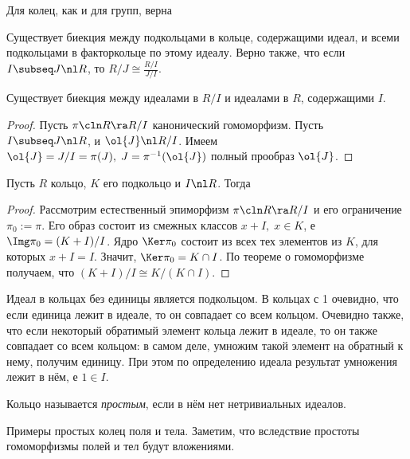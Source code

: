 \documentclass[a4paper]{article}
\begin{document}
Для колец, как и для групп, верна
\begin{theorem}[О соответствии]
Существует биекция между подкольцами в кольце, содержащими идеал, и всеми подкольцами в факторкольце  по
этому идеалу. Верно также, что если $I \subseq J \nl R$, то $R/J \cong \frac{R/I}{J/I}$.
\end{theorem}

\begin{stm}
Существует биекция между идеалами в $R/I$ и идеалами в $R$, содержащими $I$.
\end{stm}
\begin{proof}
Пусть $\pi\cln R \ra R/I$ канонический гомоморфизм. Пусть $I \subseq J \nl R$, и $\ol{J} \nl R/I$. Имеем
$\ol{J} = J/I = \pi(J), \; J=\pi^{-1}(\ol{J})$ полный прообраз $\ol{J}$.
\end{proof}

\begin{theorem}[Об изоморфизме]
Пусть $R$ кольцо, $K$ его подкольцо и $I \nl R$. Тогда
\end{theorem}
\begin{proof}
Рассмотрим естественный эпиморфизм $\pi\cln R \ra R/I$ и его ограничение $\pi_0:=\pi$\raisebox{-2pt}{$\rvert_K$}. Его образ
состоит из смежных классов $x+I, \; x \in K$, е $\Img \pi_0 = (K+I)/I$. Ядро $\Ker \pi_0$ состоит из всех
тех элементов из $K$, для которых $x+I=I$. Значит, $\Ker \pi_0 = K \cap I$. По теореме о гомоморфизме
получаем, что $(K+I)/I \cong K/(K \cap I)$.
\end{proof}

\begin{note}
Идеал в кольцах без единицы является подкольцом. В кольцах с 1 очевидно, что если единица лежит в идеале, то он совпадает со всем кольцом.
Очевидно также, что если некоторый обратимый элемент кольца лежит в идеале, то он также совпадает со всем кольцом: в самом деле, умножим такой
элемент на обратный к нему, получим единицу. При этом по определению идеала результат умножения лежит в нём, е $1 \in I$.
\end{note}

\begin{df}
Кольцо называется \emph{простым}, если в нём нет нетривиальных идеалов.
\end{df}

\begin{ex}
Примеры простых колец поля и тела. Заметим, что вследствие простоты гомоморфизмы полей и тел будут
вложениями.
\end{ex}
\end{document}
